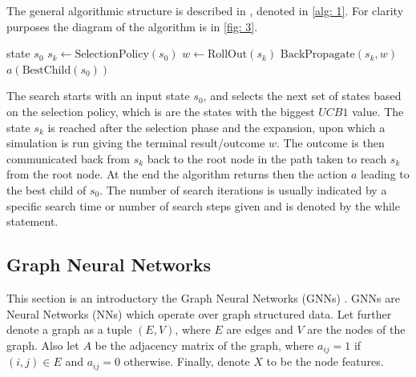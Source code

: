 The general algorithmic structure is described in \cite{mcts_survey}, denoted
in \ref{alg: 1}. For clarity purposes the diagram of the algorithm is in
\ref{fig: 3}.
\begin{algorithm}
\caption{MCTS Algorithm}\label{alg: 1}
    \begin{algorithmic}
        \Require state $s_0$
            \State $s_k \gets \text{SelectionPolicy}(s_0)$
            \State  $w \gets \text{RollOut}(s_k)$
            \State $\text{BackPropagate}(s_k, w)$
        \EndWhile
        \Ensure $a\left(\text{BestChild}(s_0)\right)$
    \end{algorithmic}
\end{algorithm}
The search starts with an input state $s_0$, and selects the next set of
states based on the selection policy, which is are the states with the
biggest $UCB1$ value. The state $s_k$ is reached after the selection phase
and the expansion, upon which a simulation is run giving the terminal
result/outcome $w$. The outcome is then communicated back from $s_k$ back to the
root node in the path taken to reach $s_k$ from the root node. At the end the
algorithm returns then the  action $a$ leading to the best child of $s_0$.
The number of search iterations is usually indicated by a specific search
time or number of search steps given and is denoted by the while statement.

\subsection{Graph Neural Networks \label{sec: gnn}}
This section is an introductory the Graph Neural Networks (GNNs)
\cite{gnn_overview}. GNNs are Neural Networks (NNs) which operate over graph
structured data. Let further denote a graph as a tuple $(E, V)$, where $E$
are edges and $V$ are the nodes of the graph. Also let $A$ be the adjacency
matrix of the graph, where $a_{ij} = 1$ if $(i, j) \in E$ and $a_{ij} =0$
otherwise. Finally, denote $X$ to be the node features.
\newline

